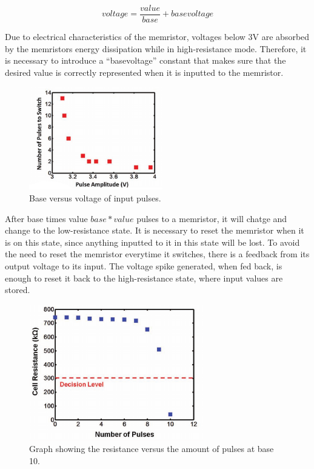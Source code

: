 \documentclass[ecp,tc,english]{iiufrgs}
\begin{document}
\begin{equation}
  voltage = \frac{value}{base} + basevoltage
\end{equation}

Due to electrical characteristics of the memristor, voltages below 3V are absorbed by the memristors energy dissipation while in high-resistance mode. Therefore, it is necessary to introduce a “basevoltage” constant that makes sure that the desired value is correctly represented when it is inputted to the memristor.

\begin{figure}
  \caption{Base versus voltage of input pulses.}
  \centerline{\includegraphics{fig/memristor-basexvoltage.png}}
  \label{fig:mr_bxv}
\end{figure}

After base times value $ base * value $ pulses to a memristor, it will chatge and change to the low-resistance state. It is necessary to reset the memristor when it is on this state, since anything inputted to it in this state will be lost. To avoid the need to reset the memristor everytime it switches, there is a feedback from its output voltage to its input. The voltage spike generated, when fed back, is enough to reset it back to the high-resistance state, where input values are stored.

\begin{figure}
  \caption{Graph showing the resistance versus the amount of pulses at base 10.}
  \centerline{\includegraphics{fig/memristor-resistancexpulses.png}}
  \label{fig:mr_rxp}
\end{figure}
\end{document}
